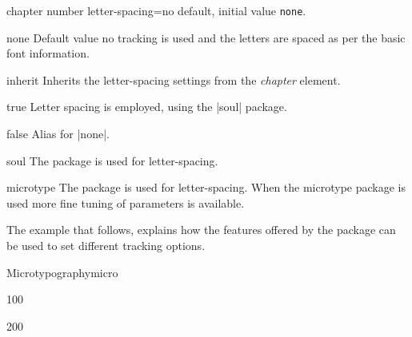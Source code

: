 \begin{decription}
{%
%

\begin{docKey}[phd]{chapter number letter-spacing}{=}{no default, initial value \texttt{none}}.
\end{docKey}

\begin{marglist}
\item[none] Default value no tracking is used and the letters are spaced as per the basic font information.
\item[inherit] Inherits the letter-spacing settings from the \emph{chapter} element.
\item[true] Letter spacing is employed, using the |soul| package.
\item[false] Alias for |none|.
\item[soul] The  package is used for letter-spacing.
\item[microtype] The  package is used for letter-spacing. When the microtype package is used more fine tuning of parameters is available.
\end{marglist}

The example that follows, explains how the features offered by the  package can be used to
set different tracking options.

\begin{texexample}{Microtypography}{micro}
\bgroup

 { 100 }

{\huge {}}

 { 200 }
 
{\huge {}}


\end{texexample}}
\end{decription}

